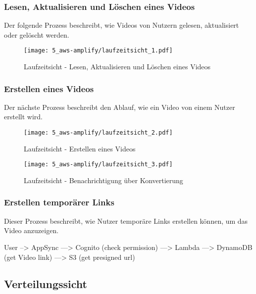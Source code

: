 \subsubsection{Lesen, Aktualisieren und Löschen eines Videos}

Der folgende Prozess beschreibt, wie Videos von Nutzern gelesen, aktualisiert oder gelöscht werden.

\begin{figure}
  \centering
  \texttt{[image: 5\_aws-amplify/laufzeitsicht\_1.pdf]}
  \caption{Laufzeitsicht - Lesen, Aktualisieren und Löschen eines Videos}
  \label{Amplify:laufzeitsicht1}
\end{figure}

\subsubsection{Erstellen eines Videos}

Der nächste Prozess beschreibt den Ablauf, wie ein Video von einem Nutzer erstellt wird.

\begin{figure}
  \centering
  \texttt{[image: 5\_aws-amplify/laufzeitsicht\_2.pdf]}
  \caption{Laufzeitsicht - Erstellen eines Videos}
  \label{Amplify:laufzeitsicht2}
\end{figure}

\begin{figure}
  \centering
  \texttt{[image: 5\_aws-amplify/laufzeitsicht\_3.pdf]}
  \caption{Laufzeitsicht - Benachrichtigung über Konvertierung}
  \label{Amplify:laufzeitsicht3}
\end{figure}

\subsubsection{Erstellen temporärer Links}

Dieser Prozess beschreibt, wie Nutzer temporäre Links erstellen können, um das Video anzuzeigen.

  User --> AppSync ---> Cognito (check permission)
                   ---> Lambda  ---> DynamoDB (get Video link)
                                ---> S3 (get presigned url)

\subsection{Verteilungssicht}

